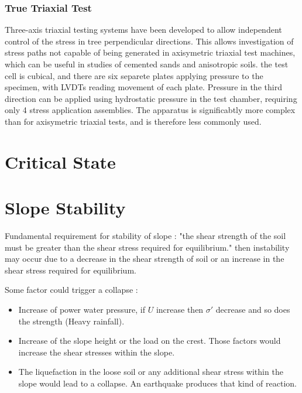         \subsubsection{True Triaxial Test}
        
            Three-axis triaxial testing systems have been developed to allow independent control of the stress in tree perpendicular directions. This allows investigation of stress paths not capable of being generated in axisymetric triaxial test machines, which can be useful in studies of cemented sands and anisotropic soils. the test cell is cubical, and there are six separete plates applying pressure to the specimen, with LVDTs reading movement of each plate. Pressure in the third direction can be applied using hydrostatic pressure in the test chamber, requiring only 4 stress application assemblies. The apparatus is significabtly more complex than for axisymetric triaxial tests, and is therefore less commonly used.
            
\section{Critical State}

\section{Slope Stability}

    Fundamental requirement for stability of slope : "the shear strength of the soil must be greater than the shear stress required for equilibrium." then instability may occur due to a decrease in the shear strength of soil or an increase in the shear stress required for equilibrium.
    
    \medskip
    Some factor could trigger a collapse :
    
    \begin{itemize}
        \item Increase of power water pressure, if $U$ increase then $\sigma'$ decrease and so does the strength (Heavy rainfall).    
        \item Increase of the slope height or the load on the crest. Those factors would increase the shear stresses within the slope.
        \item The liquefaction in the loose soil or any additional shear stress within the slope would lead to a collapse. An earthquake produces that kind of reaction.
    \end{itemize}
    
